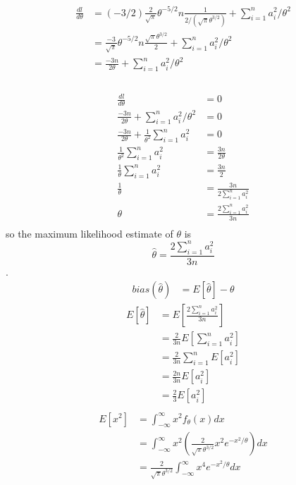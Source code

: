 \documentclass[12pt,border=4pt,multi]{article} %
\begin{document}
\begin{align*}
\frac{dl}{d\theta} &= (-3 / 2)\frac{2}{\sqrt{\pi}}\theta^{-5 / 2} n \frac{1}{2 / (\sqrt{\pi}\theta^{3 / 2})} +　\sum_{i = 1}^n a_i^2 / \theta^2\\
&= \frac{-3}{\sqrt{\pi}}\theta^{-5 / 2} n \frac{\sqrt{\pi}\theta^{3 / 2}}{2} + \sum_{i = 1}^n a_i^2 / \theta^2\\
&= \frac{-3n}{2\theta} + \sum_{i = 1}^n a_i^2 / \theta^2\\
\end{align*}\\
\begin{align*}
\frac{dl}{d\theta} &= 0\\
\frac{-3n}{2\theta} + \sum_{i = 1}^n a_i^2 / \theta^2 &= 0\\
\frac{-3n}{2\theta} + \frac{1}{\theta^2}\sum_{i = 1}^n a_i^2 &= 0\\
\frac{1}{\theta^2}\sum_{i = 1}^n a_i^2 &= \frac{3n}{2\theta}\\
\frac{1}{\theta}\sum_{i = 1}^n a_i^2 &= \frac{3n}{2}\\
\frac{1}{\theta} &= \frac{3n}{2\sum_{i = 1}^n a_i^2}\\
\theta &= \frac{2\sum_{i = 1}^n a_i^2}{3n}\\
\end{align*}
so the maximum likelihood estimate of $\theta$ is
\[\hat{\theta} = \frac{2\sum_{i = 1}^n a_i^2}{3n}\]
\newpage
{}.\\
\begin{align*}
bias(\hat{\theta}) &= E[\hat{\theta}] - \theta
\end{align*}
\begin{align*}
E[\hat{\theta}] &= E\left[\frac{2\sum_{i = 1}^n a_i^2}{3n}\right]\\
&= \frac{2}{3n}E[\sum_{i = 1}^n a_i^2]\\
&= \frac{2}{3n}\sum_{i = 1}^n E[a_i^2]\\
&= \frac{2n}{3n} E[a_i^2]\\
&= \frac{2}{3} E[a_i^2]\\
\end{align*}
\begin{align*}
E[x^2] &= \int_{-\infty}^{\infty} x^2 f_\theta(x) dx\\
&= \int_{-\infty}^{\infty} x^2 \left(\frac{2}{\sqrt{\pi}\theta^{3 / 2}} x^2 e^{-x^2 / \theta}\right) dx\\
&= \frac{2}{\sqrt{\pi}\theta^{3 / 2}} \int_{-\infty}^{\infty} x^4 e^{-x^2 / \theta} dx\\
\end{align*}
\end{document}
